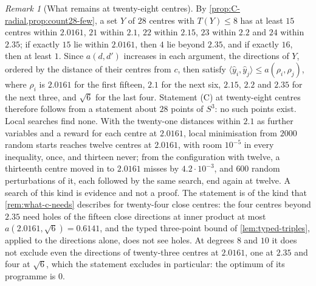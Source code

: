 \documentclass[11pt,reqno]{amsart}
\renewcommand{\_}{\origunderscore\allowbreak}
\numberwithin{equation}{section}
\theoremstyle{plain}
\theoremstyle{definition}
\theoremstyle{remark}
\newtheorem{remark}[thm]{Remark}
\begin{document}
\begin{remark}[What remains at twenty-eight centres]\label{rem:count28-rest}
By \cref{prop:C-radial,prop:count28-few}, a set $Y$ of $28$ centres with
$T(Y)\le8$ has at least $15$ centres within $2.0161$, $21$ within $2.1$,
$22$ within $2.15$, $23$ within $2.2$ and $24$ within $2.35$; if exactly $15$
lie within $2.0161$, then $4$ lie beyond $2.35$, and if exactly $16$, then at
least $1$. Since
$a(d,d')$ increases in each argument, the directions of $Y$, ordered by
the distance of their centres from $c$, then satisfy
$\langle\hat y_i,\hat y_j\rangle\le a(\rho_i,\rho_j)$, where $\rho_i$ is
$2.0161$ for the first fifteen, $2.1$ for the next six, $2.15$, $2.2$
and $2.35$ for the next three, and $\sqrt6$ for the last four. Statement
(C) at twenty-eight centres therefore follows from a statement about $28$
points of $S^3$: no such points exist. Local searches find none. With the
twenty-one distances within $2.1$ as further variables and a reward for each
centre at $2.0161$, local minimisation from $2000$ random starts reaches
twelve centres at $2.0161$, with room $10^{-5}$ in every inequality, once,
and thirteen never; from the configuration with twelve, a thirteenth centre
moved in to $2.0161$ misses by $4.2\cdot10^{-3}$, and $600$ random
perturbations of it, each followed by the same search, end again at
twelve. A search of this kind is evidence and not a proof. The statement is of the kind that
\cref{rem:what-c-needs} describes for twenty-four close centres: the four
centres beyond $2.35$ need holes of the fifteen close directions at inner
product at most $a(2.0161,\sqrt6)=0.6141$, and the typed three-point bound of
\cref{lem:typed-triples}, applied to the directions alone, does not see
holes. At degrees $8$ and $10$ it does not exclude even the directions of
twenty-three centres at $2.0161$, one at $2.35$ and four at $\sqrt6$, which
the statement excludes in particular: the optimum of its programme is $0$.


\end{remark}
\end{document}
